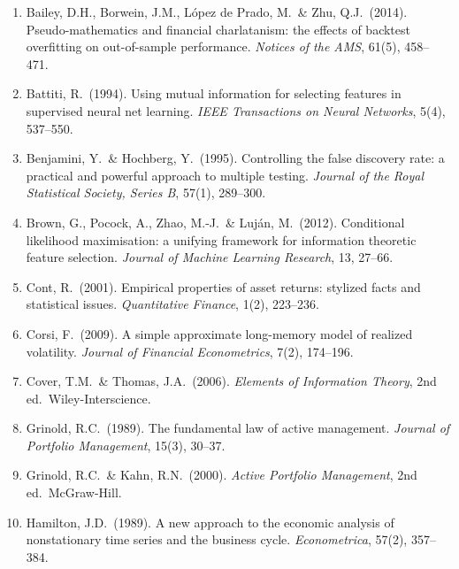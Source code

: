 \documentclass[11pt,a4paper]{article}
\theoremstyle{definition}
\theoremstyle{plain}
\begin{document}
\begin{enumerate}

  \item Bailey, D.H., Borwein, J.M., L\'opez de Prado, M.\ \& Zhu, Q.J.\ (2014). Pseudo-mathematics
        and financial charlatanism: the effects of backtest overfitting on out-of-sample
        performance. \textit{Notices of the AMS}, 61(5), 458--471.

  \item Battiti, R.\ (1994). Using mutual information for selecting features in supervised neural net
        learning. \textit{IEEE Transactions on Neural Networks}, 5(4), 537--550.

  \item Benjamini, Y.\ \& Hochberg, Y.\ (1995). Controlling the false discovery rate: a practical and
        powerful approach to multiple testing. \textit{Journal of the Royal Statistical Society,
        Series B}, 57(1), 289--300.

  \item Brown, G., Pocock, A., Zhao, M.-J.\ \& Luj\'an, M.\ (2012). Conditional likelihood
        maximisation: a unifying framework for information theoretic feature selection.
        \textit{Journal of Machine Learning Research}, 13, 27--66.

  \item Cont, R.\ (2001). Empirical properties of asset returns: stylized facts and statistical
        issues. \textit{Quantitative Finance}, 1(2), 223--236.

  \item Corsi, F.\ (2009). A simple approximate long-memory model of realized volatility.
        \textit{Journal of Financial Econometrics}, 7(2), 174--196.

  \item Cover, T.M.\ \& Thomas, J.A.\ (2006). \textit{Elements of Information Theory}, 2nd ed.\
        Wiley-Interscience.

  \item Grinold, R.C.\ (1989). The fundamental law of active management. \textit{Journal of Portfolio
        Management}, 15(3), 30--37.

  \item Grinold, R.C.\ \& Kahn, R.N.\ (2000). \textit{Active Portfolio Management}, 2nd ed.\
        McGraw-Hill.

  \item Hamilton, J.D.\ (1989). A new approach to the economic analysis of nonstationary time series
        and the business cycle. \textit{Econometrica}, 57(2), 357--384.


\end{enumerate}
\end{document}
